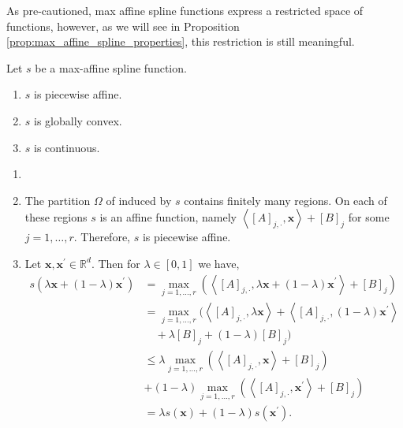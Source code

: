 As pre-cautioned, max affine spline functions express a restricted space of functions, however, as we will see in Proposition \ref{prop:max_affine_spline_properties}, this restriction is still meaningful.

\begin{proposition}\label{prop:max_affine_spline_properties}
    Let $s$ be a max-affine spline function.
    \begin{enumerate}
        \item $s$ is piecewise affine.
        \item $s$ is globally convex.
        \item $s$ is continuous.
    \end{enumerate}
\end{proposition}

\begin{tproof}
    \begin{enumerate}
        \item[]
        \item The partition $\Omega$ of induced by $s$ contains finitely many regions. On each of these regions $s$ is an affine function, namely $\left\langle[A]_{j,\cdot},\mathbf{x}\right\rangle+[B]_j$ for some $j=1,\dots,r$. Therefore, $s$ is piecewise affine.
        \item Let $\mathbf{x},\mathbf{x}^\prime\in\mathbb{R}^d$. Then for $\lambda\in[0,1]$ we have, 
        \begin{align*}
            s\left(\lambda\mathbf{x}+(1-\lambda)\mathbf{x}^\prime\right)&=\max_{j=1,\dots,r}\left(\left\langle[A]_{j,\cdot},\lambda\mathbf{x}+(1-\lambda)\mathbf{x}^\prime\right\rangle+[B]_j\right)\\&=\max_{j=1,\dots,r}\Big(\left\langle[A]_{j,\cdot},\lambda\mathbf{x}\right\rangle+\left\langle[A]_{j,\cdot},(1-\lambda)\mathbf{x}^\prime\right\rangle\\&\quad+\lambda[B]_j+(1-\lambda)[B]_j\Big)\\&\leq\lambda\max_{j=1,\dots,r}\left(\left\langle[A]_{j,\cdot},\mathbf{x}\right\rangle+[B]_j\right)\\&+(1-\lambda)\max_{j=1,\dots,r}\left(\left\langle[A]_{j,\cdot},\mathbf{x}^\prime\right\rangle+[B]_j\right)\\&=\lambda s(\mathbf{x})+(1-\lambda)s\left(\mathbf{x}^\prime\right).
        \end{align*}

\end{enumerate}
\end{tproof}
